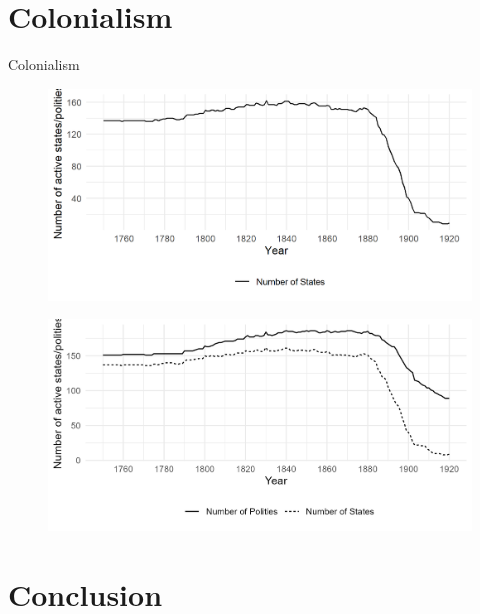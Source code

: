 \documentclass{beamer}
\begin{document}
\section{Colonialism}

\begin{frame}
	\centering 
	\begin{Large}
		Colonialism
	\end{Large}
\end{frame}

\begin{frame}
	\begin{figure}
		\includegraphics[width=\linewidth]{img/N_States_Only_Over_Time.png}
	\end{figure}
\end{frame}

\begin{frame}
	\begin{figure}
		\includegraphics[width=\textwidth]{img/N_States_Over_Time.png}
	\end{figure}
\end{frame}

\section{Conclusion}
\end{document}
